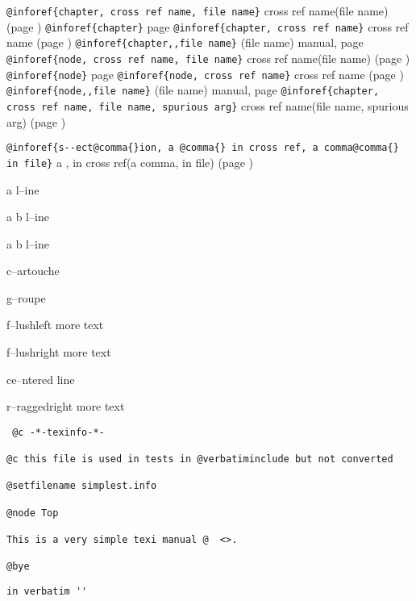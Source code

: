 \documentclass{book}
\begin{document}
\texttt{@inforef\{chapter, cross ref name, file name\}} cross ref name(file name) (page \pageref{anchor:chapter})
\texttt{@inforef\{chapter\}} page \pageref{anchor:chapter}
\texttt{@inforef\{chapter, cross ref name\}} cross ref name (page \pageref{anchor:chapter})
\texttt{@inforef\{chapter,,file name\}} (file name) manual, page \pageref{anchor:chapter}
\texttt{@inforef\{node, cross ref name, file name\}} cross ref name(file name) (page \pageref{anchor:node})
\texttt{@inforef\{node\}} page \pageref{anchor:node}
\texttt{@inforef\{node, cross ref name\}} cross ref name (page \pageref{anchor:node})
\texttt{@inforef\{node,,file name\}} (file name) manual, page \pageref{anchor:node}
\texttt{@inforef\{chapter, cross ref name, file name, spurious arg\}} cross ref name(file name, spurious arg) (page \pageref{anchor:chapter})

\texttt{@inforef\{s{-}{-}ect@comma\{\}ion, a @comma\{\} in cross
ref, a comma@comma\{\} in file\}}
a , in cross
ref(a comma, in file) (page \pageref{anchor:s_002d_002dect_002cion})


a
l--ine

a
b
l--ine

a
b
l--ine

c--artouche

g--roupe

f--lushleft
more text

f--lushright
more text

\begin{center}
ce--ntered line
\end{center}

\begin{flushleft}
r--raggedright
more text
\end{flushleft}

\begin{verbatim}
 @c -*-texinfo-*-

@c this file is used in tests in @verbatiminclude but not converted

@setfilename simplest.info

@node Top

This is a very simple texi manual @  <>.

@bye
\end{verbatim}

\begin{verbatim}
in verbatim ''
\end{verbatim}
\end{document}
